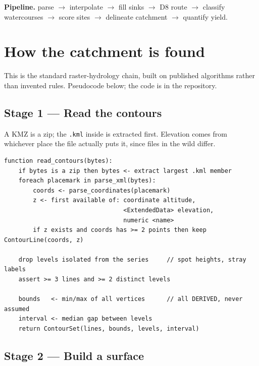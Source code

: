 \documentclass[11pt,a4paper]{article}
\newenvironment{algobox}[1]{%
  \par\addvspace{5pt}%
  \def\FrameCommand{{\color{water}\vrule width 2.5pt}\hspace{9pt}}%
  \MakeFramed{\advance\hsize-\width\FrameRestore}%
  \noindent{\small\bfseries\color{water}#1}\par\nobreak\addvspace{2pt}%
}{\par\endMakeFramed\addvspace{5pt}}
\begin{document}
\noindent\textbf{Pipeline.}\quad
parse $\rightarrow$ interpolate $\rightarrow$ fill sinks $\rightarrow$ D8 route
$\rightarrow$ classify watercourses $\rightarrow$ score sites $\rightarrow$
delineate catchment $\rightarrow$ quantify yield.

\section{How the catchment is found}
\label{sec:approach}

This is the standard raster-hydrology chain, built on published algorithms
rather than invented rules. Pseudocode below; the code is in the repository.

\subsection{Stage 1 --- Read the contours}

A KMZ is a zip; the \texttt{.kml} inside is extracted first. Elevation comes from
whichever place the file actually puts it, since files in the wild differ.

\begin{algobox}{Algorithm 1 --- Read contours}
\begin{lstlisting}[style=pseudostyle]
function read_contours(bytes):
    if bytes is a zip then bytes <- extract largest .kml member
    foreach placemark in parse_xml(bytes):
        coords <- parse_coordinates(placemark)
        z <- first available of: coordinate altitude,
                                 <ExtendedData> elevation,
                                 numeric <name>
        if z exists and coords has >= 2 points then keep ContourLine(coords, z)

    drop levels isolated from the series     // spot heights, stray labels
    assert >= 3 lines and >= 2 distinct levels

    bounds   <- min/max of all vertices      // all DERIVED, never assumed
    interval <- median gap between levels
    return ContourSet(lines, bounds, levels, interval)
\end{lstlisting}
\end{algobox}

\subsection{Stage 2 --- Build a surface}
\end{document}
